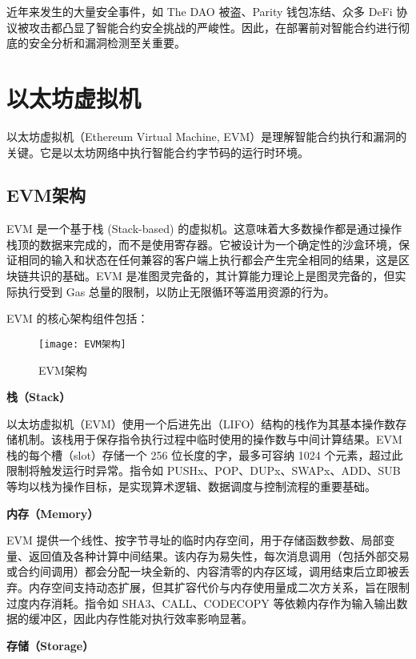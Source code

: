 \documentclass[print, master, vlined, timesmath]{DissertUESTC}
\begin{document}
近年来发生的大量安全事件，如 The DAO 被盗、Parity 钱包冻结、众多 DeFi 协议被攻击都凸显了智能合约安全挑战的严峻性。因此，在部署前对智能合约进行彻底的安全分析和漏洞检测至关重要。

\section{以太坊虚拟机}
以太坊虚拟机（Ethereum Virtual Machine, EVM）是理解智能合约执行和漏洞的关键。它是以太坊网络中执行智能合约字节码的运行时环境。

\subsection{EVM架构}

EVM 是一个基于栈 (Stack-based) 的虚拟机\textsuperscript{\cite{yellowbook}}。这意味着大多数操作都是通过操作栈顶的数据来完成的，而不是使用寄存器。它被设计为一个确定性的沙盒环境\textsuperscript{\cite{jamwal2024survey}}，保证相同的输入和状态在任何兼容的客户端上执行都会产生完全相同的结果，这是区块链共识的基础。EVM 是准图灵完备的\textsuperscript{\cite{wang2025tsgn}}，其计算能力理论上是图灵完备的，但实际执行受到 Gas 总量的限制，以防止无限循环等滥用资源的行为。

EVM 的核心架构组件包括：

\begin{figure}[htbp]
    \centering
    \texttt{[image: EVM架构]}
    \caption{EVM架构}
    \label{fig:EVM架构}
\end{figure}

\textbf{栈（Stack）}

以太坊虚拟机（EVM）使用一个后进先出（LIFO）结构的栈作为其基本操作数存储机制。该栈用于保存指令执行过程中临时使用的操作数与中间计算结果。EVM 栈的每个槽（slot）存储一个 256 位长度的字，最多可容纳 1024 个元素，超过此限制将触发运行时异常。指令如 PUSHx、POP、DUPx、SWAPx、ADD、SUB 等均以栈为操作目标，是实现算术逻辑、数据调度与控制流程的重要基础。

\textbf{内存（Memory）}

EVM 提供一个线性、按字节寻址的临时内存空间，用于存储函数参数、局部变量、返回值及各种计算中间结果。该内存为易失性，每次消息调用（包括外部交易或合约间调用）都会分配一块全新的、内容清零的内存区域，调用结束后立即被丢弃。内存空间支持动态扩展，但其扩容代价与内存使用量成二次方关系，旨在限制过度内存消耗。指令如 SHA3、CALL、CODECOPY 等依赖内存作为输入输出数据的缓冲区，因此内存性能对执行效率影响显著。

\textbf{存储（Storage）}
\end{document}
